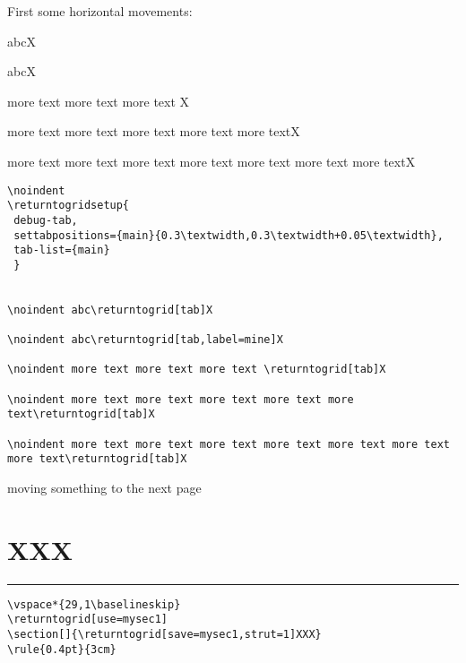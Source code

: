 \documentclass[twoside,parskip=half-,fontsize=12pt,egregdoesnotlikesansseriftitles,headings=normal]{scrartcl}
\begin{document}
First some horizontal movements:

\noindent
{}


\noindent abc\returntogrid[tab]X

\noindent abc\returntogrid[tab,label=mine]X

\noindent more text more text more text \returntogrid[tab]X

\noindent more text more text more text more text more text\returntogrid[tab]X

\noindent more text more text more text more text more text more text more text\returntogrid[tab]X


\begin{lstlisting}[breaklines]
\noindent
\returntogridsetup{
 debug-tab,
 settabpositions={main}{0.3\textwidth,0.3\textwidth+0.05\textwidth},
 tab-list={main}
 }


\noindent abc\returntogrid[tab]X

\noindent abc\returntogrid[tab,label=mine]X

\noindent more text more text more text \returntogrid[tab]X

\noindent more text more text more text more text more text\returntogrid[tab]X

\noindent more text more text more text more text more text more text more text\returntogrid[tab]X
\end{lstlisting}


\newpage
\AddToShipoutPictureBG {\AtTextUpperLeft{\showdebugpagegrid}}
moving something to the next page
\vspace*{29,1\baselineskip}
\returntogrid[use=mysec1]
\section[]{\returntogrid[save=mysec1,strut=1]XXX}
\rule{0.4pt}{3cm}




\begin{lstlisting}
\vspace*{29,1\baselineskip}
\returntogrid[use=mysec1]
\section[]{\returntogrid[save=mysec1,strut=1]XXX}
\rule{0.4pt}{3cm}
\end{lstlisting}
\end{document}
